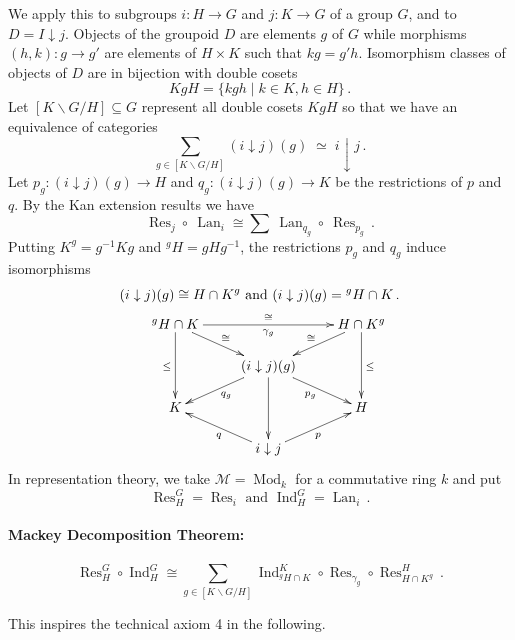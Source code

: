\documentclass[a4paper,12pt]{article}
\theoremstyle{definition}
\theoremstyle{fact}
\theoremstyle{genquest}
\theoremstyle{step}
\newcommand{\Ind}{\operatorname{Ind}}
\newcommand{\Lan}{\operatorname{Lan}}
\newcommand{\funcM}{\mathcal{M}}
\newcommand{\Mod}{\operatorname{Mod}}
\newcommand{\Res}{\operatorname{Res}}
\begin{document}
We apply this to subgroups $i : H \to G$ and $j : K \to G$ of a group $G$, and to $D = I \downarrow j$.    Objects of the groupoid  $D$ are elements $g$ of $G$ while morphisms $(h,k) : g \to g'$ are elements of $H \times K$ such that $kg =g'h$.   Isomorphism classes of objects of $D$ are in bijection with double cosets
\[
KgH = \{kgh \mid k \in K, h \in H\}\,.
\]
Let $[K\backslash G/H] \subseteq G$ represent all double cosets $KgH$ so that we have an equivalence of categories
\[
\sum_{g\in[K\backslash G/H]} (i\downarrow j) (g) \;\simeq \; i\downarrow j\,.
\]
Let $p_g : (i \downarrow j) (g) \to H$ and $q_g : (i \downarrow j) (g) \to K$ be the restrictions of $p$ and $q$.  
By the Kan extension results we have
\[
\Res_j \circ \ \Lan_i \cong \sum \ \Lan_{q_g} \circ \ \Res_{p_g}\,.
\]
Putting $K^g = g^{-1} Kg$ and $^g H = g H g^{-1}$, the restrictions $p_g$ and $q_g$ induce isomorphisms
\begin{align*}
& (i\downarrow j) (g) \cong H \cap K^g \text{ and } (i\downarrow j)(g) =  {}^gH \cap K\,.
\\ %
& \qquad \xymatrix @R-3mm {
 ^g H \cap K\ar[dd]_\leq \ar[dr]^\cong \ar[rr]^\cong_{\gamma_g}   && H \cap K^g \ar[ld]_\cong \ar[dd]^\leq \\
 & (i\downarrow j) (g) \ar[ld]^{q_g} \ar[rd]_{p_g} \ar[dd] & 
\\
K &  & H  
\\
  & i\downarrow j   \ar[lu]^q    \ar[ru]_p} 
\end{align*}
In representation theory, we take $\funcM = \Mod_k$ for a commutative ring $k$ and put
\[
\Res^G_H = \Res_i \text{ and } \Ind^G_H = \Lan_i\,.
\]

\paragraph*{Mackey Decomposition Theorem:}
\[
\Res^G_H \circ \Ind^G_H  \cong 
 \sum_{g\in[K\backslash G/H]} \Ind^K_{{^{g}H\cap K}}  \circ     \Res_{\gamma^{}_g}  \circ \Res^H_{H \cap K^g}\,.
\]

\noindent
This inspires the technical axiom 4 in the following.
\end{document}
